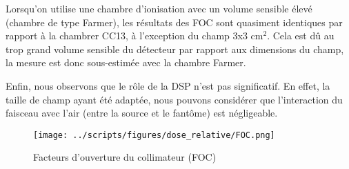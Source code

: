 \documentclass{article}
\begin{document}
Lorsqu'on utilise une chambre d'ionisation avec un volume sensible élevé (chambre de type Farmer), les résultats des FOC sont quasiment identiques par rapport à la chambrer CC13, à l'exception du champ 3x3 cm$^2$. Cela est dû au trop grand volume sensible du détecteur par rapport aux dimensions du champ, la mesure est donc sous-estimée avec la chambre Farmer.

Enfin,  nous observons que le rôle de la DSP n'est pas significatif. En effet, la taille de champ ayant été adaptée, nous pouvons considérer que l'interaction du faisceau avec l'air (entre la source et le fantôme) est négligeable.

\begin{figure}[h]
  \centering
  \texttt{[image: ../scripts/figures/dose\_relative/FOC.png]}
  \caption{Facteurs d'ouverture du collimateur (FOC)}
  \label{fig_foc}
\end{figure}

\clearpage


\nocite{*}
\end{document}
